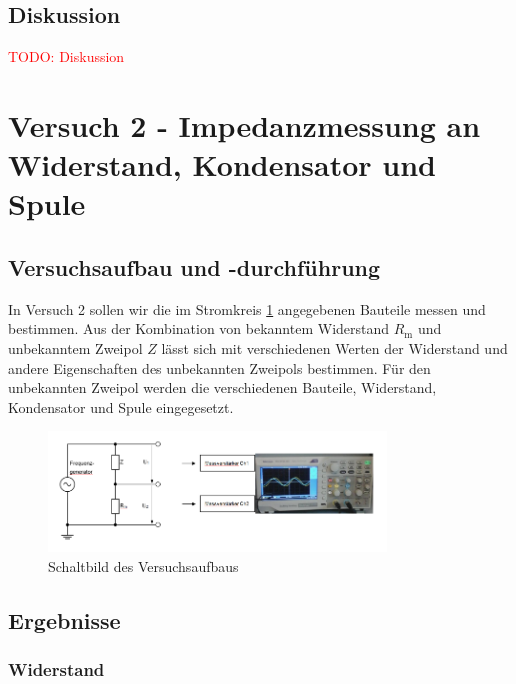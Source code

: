     \subsection{Diskussion}

        \textcolor{red}{TODO: Diskussion}
    
\section{Versuch 2 - Impedanzmessung an Widerstand, Kondensator und Spule}
    
    \subsection{Versuchsaufbau und -durchführung}
        
        In Versuch 2 sollen wir die im Stromkreis \ref{fig:Versuch2_Schaltbild} angegebenen Bauteile messen und bestimmen. Aus der Kombination von bekanntem Widerstand $R_{\mathrm{m}}$ und unbekanntem Zweipol $Z$ lässt sich mit verschiedenen Werten der Widerstand und andere Eigenschaften des unbekannten Zweipols bestimmen. Für den unbekannten Zweipol werden die verschiedenen Bauteile, Widerstand, Kondensator und Spule eingegesetzt.

        \begin{figure}[H]
            \centering
            \includegraphics[width=0.8\textwidth]{bilder/Versuch2_Aufbau.png}
            \caption{Schaltbild des Versuchsaufbaus}
            \label{fig:Versuch2_Schaltbild}
        \end{figure}

    \subsection{Ergebnisse}

        \subsubsection{Widerstand}

